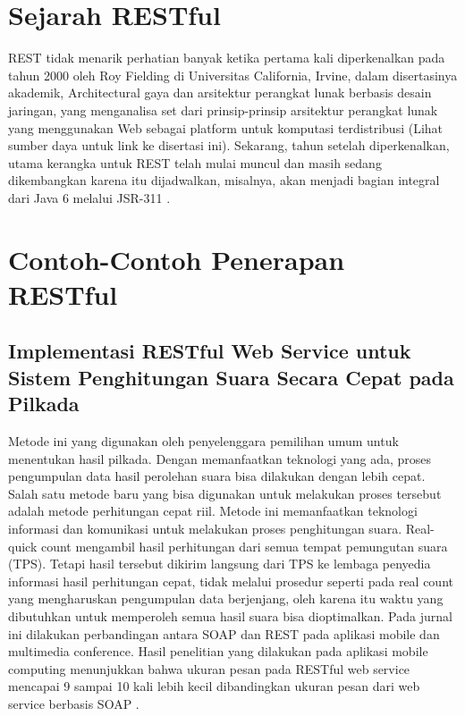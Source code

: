 \section{Sejarah RESTful}
REST tidak menarik perhatian banyak ketika pertama kali diperkenalkan pada tahun 2000 oleh Roy Fielding di Universitas California, Irvine, dalam disertasinya akademik, Architectural gaya dan arsitektur perangkat lunak berbasis desain jaringan, yang menganalisa set dari prinsip-prinsip arsitektur perangkat lunak yang menggunakan Web sebagai platform untuk komputasi terdistribusi (Lihat sumber daya untuk link ke disertasi ini). Sekarang, tahun setelah diperkenalkan, utama kerangka untuk REST telah mulai muncul dan masih sedang dikembangkan karena itu dijadwalkan, misalnya, akan menjadi bagian integral dari Java 6 melalui JSR-311 \cite{rodriguez2008restful}.

\section{Contoh-Contoh Penerapan  RESTful}
\subsection{Implementasi RESTful Web Service untuk Sistem Penghitungan Suara Secara Cepat pada Pilkada}
Metode ini yang digunakan oleh penyelenggara pemilihan umum untuk menentukan hasil pilkada. Dengan memanfaatkan teknologi yang ada, proses pengumpulan data hasil perolehan suara bisa dilakukan dengan lebih cepat. Salah satu metode baru yang bisa digunakan untuk melakukan proses tersebut adalah metode perhitungan cepat riil. Metode ini memanfaatkan teknologi informasi dan komunikasi untuk melakukan proses penghitungan suara. Real-quick count mengambil hasil perhitungan dari semua tempat pemungutan suara (TPS). Tetapi hasil tersebut dikirim langsung dari TPS ke lembaga penyedia informasi hasil perhitungan cepat, tidak melalui prosedur seperti pada real count yang mengharuskan pengumpulan data berjenjang, oleh karena itu waktu yang dibutuhkan untuk memperoleh semua hasil suara bisa dioptimalkan. Pada jurnal ini dilakukan perbandingan antara SOAP dan REST pada aplikasi mobile dan multimedia conference. Hasil penelitian yang dilakukan pada aplikasi mobile computing menunjukkan bahwa ukuran pesan pada RESTful web service mencapai 9 sampai 10 kali lebih kecil dibandingkan ukuran pesan dari web service berbasis SOAP \cite{rofiq2017implementasi}.

